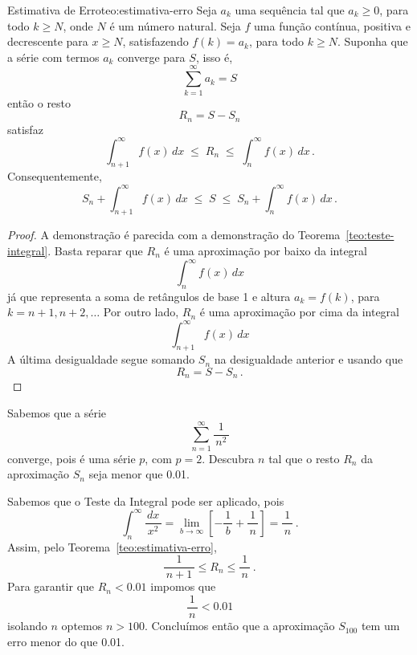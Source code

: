 \begin{teorema}{Estimativa de Erro}{teo:estimativa-erro}
  Seja%
  $a_k$ uma sequência tal que $a_k\geq 0$,
  para todo $k\geq N$, onde $N$ é um número natural.
  Seja $f$ uma função contínua, positiva e decrescente para $x\geq N$,
  satisfazendo $f(k)=a_k$, para todo $k\geq N$.
  Suponha que a série com termos $a_k$ converge para $S$, isso é,
  \[
    \sum_{k=1}^\infty a_k = S
  \]
  então o resto
  \[
    R_n=S-S_n
  \]
  satisfaz
  \[
    \int_{n+1}^\infty f(x)\,dx \;\leq\; R_n \;\leq\; \int_{n}^\infty f(x)\,dx        \,.
  \]
  Consequentemente,
  \[
    S_n+\int_{n+1}^\infty f(x)\,dx \;\leq\; S \;\leq\; S_n+\int_{n}^\infty f(x)\,dx        \,.
  \]
\end{teorema}
\begin{proof}
  A demonstração é parecida com a demonstração do Teorema~\ref{teo:teste-integral}.
  Basta reparar que $R_n$ é uma aproximação por baixo da integral
  \[
    \int_{n}^\infty f(x)\,dx
  \]
  já que representa a soma de retângulos de base 1 e altura
  $a_k=f(k)$, para $k=n+1, n+2, \dots$
  Por outro lado, $R_n$ é uma aproximação por cima da integral
  \[
    \int_{n+1}^\infty f(x)\,dx
  \]
  A última desigualdade segue somando $S_n$ na desigualdade anterior e usando que
  \[
    R_n = S - S_n              \,.
  \]
\end{proof}

\begin{example}
  Sabemos que a série
  \[
    \sum_{n=1}^\infty\frac{1}{\,n^2\,}
  \]
  converge, pois é uma série $p$, com $p=2$.
  Descubra $n$ tal que o resto $R_n$ da aproximação $S_n$ seja menor que \num{0.01}.

  \solution
  Sabemos que o Teste da Integral pode ser aplicado, pois
  \[
    \int_n^\infty\frac{\,dx\,}{x^2}
      = \lim_{b\to\infty}\left[ -\frac{1}{\,b\,} + \frac{1}{\,n\,} \right]
      = \frac{1}{\,n\,}                \,.
  \]
  Assim, pelo Teorema~\ref{teo:estimativa-erro},
  \[
    \frac{1}{\,n+1\,} \leq R_n \leq \frac{1}{\,n\,}           \,.
  \]
  Para garantir que $R_n<\num{0.01}$ impomos que
  \[
    \frac{1}{\,n\,} < \num{0.01}
  \]
  isolando $n$ optemos $n>100$. Concluímos então que a aproximação $S_{100}$
  tem um erro menor do que \num{0.01}.
\end{example}

